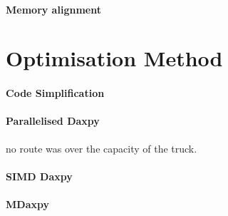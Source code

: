 \documentclass[conference]{acmsiggraph}
\begin{document}
\paragraph{Memory alignment}


\section{Optimisation Method}

\paragraph{Code Simplification}

\paragraph{Parallelised Daxpy}
 no route was over the capacity of the truck.

\paragraph{SIMD Daxpy}


\paragraph{MDaxpy}


\afterpage{\clearpage}
\end{document}
